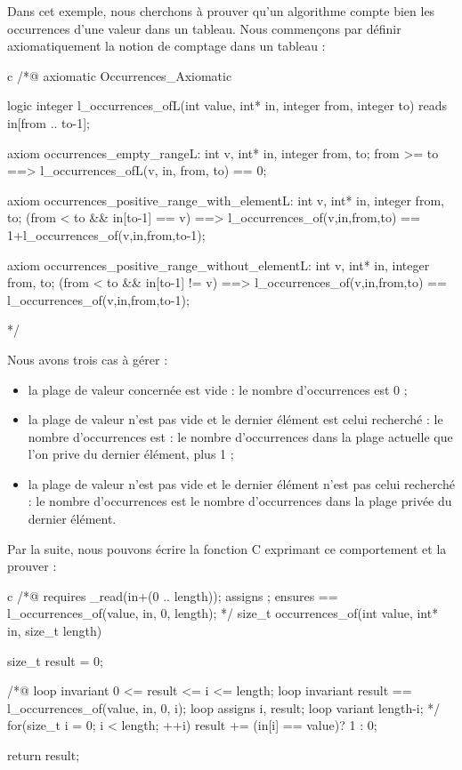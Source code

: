 \documentclass[middle]{zmdocument}
\begin{document}


Dans cet exemple, nous cherchons à prouver qu'un algorithme compte bien les 
occurrences d'une valeur dans un tableau. Nous commençons par définir 
axiomatiquement la notion de comptage dans un tableau :



\begin{CodeBlock}{c}
/*@
  axiomatic Occurrences_Axiomatic{
    logic integer l_occurrences_of{L}(int value, int* in, integer from, integer to)
      reads in[from .. to-1];

    axiom occurrences_empty_range{L}:
      \forall int v, int* in, integer from, to;
        from >= to ==> l_occurrences_of{L}(v, in, from, to) == 0;

    axiom occurrences_positive_range_with_element{L}:
      \forall int v, int* in, integer from, to;
        (from < to && in[to-1] == v) ==>
      l_occurrences_of(v,in,from,to) == 1+l_occurrences_of(v,in,from,to-1);

    axiom occurrences_positive_range_without_element{L}:
      \forall int v, int* in, integer from, to;
        (from < to && in[to-1] != v) ==>
      l_occurrences_of(v,in,from,to) == l_occurrences_of(v,in,from,to-1);
  }
*/
\end{CodeBlock}



Nous avons trois cas à gérer :



\begin{itemize}
\item la plage de valeur concernée est vide : le nombre d'occurrences est 0 ;
\item la plage de valeur n'est pas vide et le dernier élément est celui recherché :
le nombre d'occurrences est : le nombre d'occurrences dans la plage actuelle que
l'on prive du dernier élément, plus 1 ;
\item la plage de valeur n'est pas vide et le dernier élément n'est pas celui 
recherché : le nombre d'occurrences est le nombre d'occurrences dans la plage
privée du dernier élément.
\end{itemize}


Par la suite, nous pouvons écrire la fonction C exprimant ce comportement et la
prouver :



\begin{CodeBlock}{c}
/*@
  requires \valid_read(in+(0 .. length));
  assigns  \nothing;
  ensures  \result == l_occurrences_of(value, in, 0, length);
*/
size_t occurrences_of(int value, int* in, size_t length){
  size_t result = 0;
  
  /*@
    loop invariant 0 <= result <= i <= length;
    loop invariant result == l_occurrences_of(value, in, 0, i);
    loop assigns i, result;
    loop variant length-i;
  */
  for(size_t i = 0; i < length; ++i)
    result += (in[i] == value)? 1 : 0;

  return result;
}
\end{CodeBlock}
\end{document}
